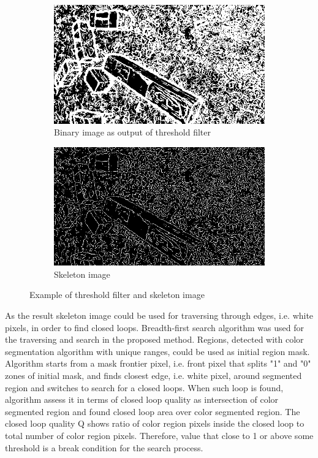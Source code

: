 \documentclass{ctuthesis}
\begin{document}
\begin{figure}[htbp]
     \centering
     \begin{subfigure}{0.475\textwidth}
         \centering
         \includegraphics[width=\textwidth]{bin.png}
         \caption{Binary image as output of threshold filter}
         \label{fig:bin}
     \end{subfigure}
     \hfill
     \begin{subfigure}{0.475\textwidth}
         \centering
         \includegraphics[width=\textwidth]{skel.png}
         \caption{Skeleton image}
         \label{fig:skel}
     \end{subfigure}

        \caption{Example of threshold filter and skeleton image}
        \label{fig:2-8}
\end{figure}

As the result skeleton image could be used for traversing through edges, i.e. white pixels, in order to find closed loops. Breadth-first search algorithm was used for the traversing and search in the proposed method. Regions, detected with color segmentation algorithm with unique ranges, could be used as initial region mask. Algorithm starts from a mask frontier pixel, i.e. front pixel that splits "1" and "0" zones of initial mask, and finds closest edge, i.e. white pixel, around segmented region and switches to search for a closed loops. When such loop is found, algorithm assess it in terms of closed loop quality as intersection of color segmented region and found closed loop area over color segmented region. The closed loop quality Q shows ratio of color region pixels inside the closed loop to total number of color region pixels. Therefore, value that close to 1 or above some threshold is a break condition for the search process.
\\
\end{document}
